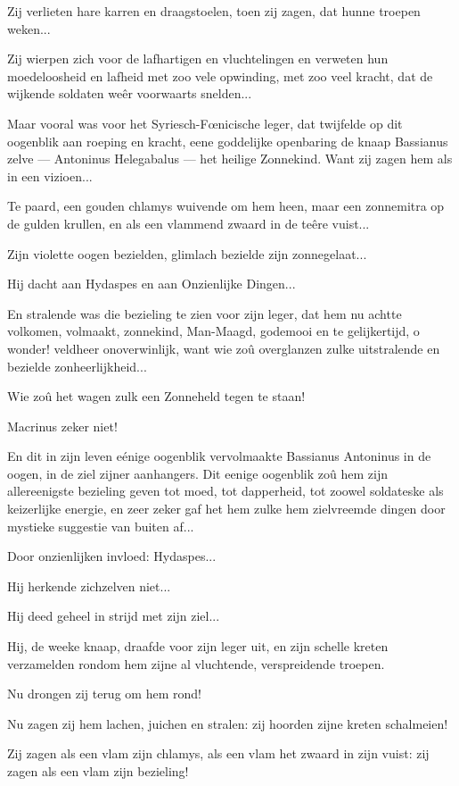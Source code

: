 \documentclass[a4paper, 12pt, oneside, dutch]{article}
\begin{document}
Zij verlieten hare karren en draagstoelen, toen zij zagen, dat hunne troepen weken...

Zij wierpen zich voor de lafhartigen en vluchtelingen en verweten hun moedeloosheid en lafheid met zoo vele opwinding, met zoo veel kracht, dat de wijkende soldaten weêr voorwaarts snelden...

Maar vooral was voor het Syriesch-Fœnicische leger, dat twijfelde op dit oogenblik aan roeping en kracht, eene goddelijke openbaring de knaap Bassianus zelve --- Antoninus Helegabalus --- het heilige Zonnekind. Want zij zagen hem als in een vizioen...

Te paard, een gouden chlamys wuivende om hem heen, maar een zonnemitra op de gulden krullen, en als een vlammend zwaard in de teêre vuist...

Zijn violette oogen bezielden, glimlach bezielde zijn zonnegelaat...

Hij dacht aan Hydaspes en aan Onzienlijke Dingen...

En stralende was die bezieling te zien voor zijn leger, dat hem nu achtte volkomen, volmaakt, zonnekind, Man-Maagd, godemooi en te gelijkertijd, o wonder! veldheer onoverwinlijk, want wie zoû overglanzen zulke uitstralende en bezielde zonheerlijkheid...

Wie zoû het wagen zulk een Zonneheld tegen te staan!

Macrinus zeker niet!

En dit in zijn leven eénige oogenblik vervolmaakte Bassianus Antoninus in de oogen, in de ziel zijner aanhangers. Dit eenige oogenblik zoû hem zijn allereenigste bezieling geven tot moed, tot dapperheid, tot zoowel soldateske als keizerlijke energie, en zeer zeker gaf het hem zulke hem zielvreemde dingen door mystieke suggestie van buiten af...

Door onzienlijken invloed: Hydaspes...

Hij herkende zichzelven niet...

Hij deed geheel in strijd met zijn ziel...

Hij, de weeke knaap, draafde voor zijn leger uit, en zijn schelle kreten verzamelden rondom hem zijne al vluchtende, verspreidende troepen.

Nu drongen zij terug om hem rond!

Nu zagen zij hem lachen, juichen en stralen: zij hoorden zijne kreten schalmeien!

Zij zagen als een vlam zijn chlamys, als een vlam het zwaard in zijn vuist: zij zagen als een vlam zijn bezieling!
\end{document}
